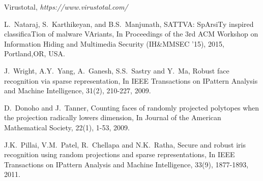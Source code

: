 \documentclass[journal]{IEEEtran}
\begin{document}
\begin{thebibliography}{1}
Virustotal, {\it https://www.virustotal.com/}

L.~Nataraj, S.~Karthikeyan, and B.S.~Manjunath, SATTVA: SpArsiTy inspired classificaTion of malware VAriants, In Proceedings of the 3rd ACM Workshop on Information Hiding and Multimedia Security (IH\&MMSEC '15), 2015, Portland,OR, USA.





J.~Wright, A.Y.~Yang, A.~Ganesh, S.S.~Sastry and Y.~Ma, Robust face recognition via sparse representation, In IEEE Transactions on IPattern Analysis and Machine Intelligence, 31(2), 210-227, 2009. 

D.~Donoho and J.~Tanner, Counting faces of randomly projected polytopes when the projection radically lowers dimension, In Journal of the American Mathematical Society, 22(1), 1-53, 2009. 



J.K.~Pillai, V.M.~Patel, R.~Chellapa and N.K.~Ratha, Secure and robust iris recognition using random projections and sparse representations, In IEEE Transactions on IPattern Analysis and Machine Intelligence, 33(9), 1877-1893, 2011. 


\end{thebibliography}
\end{document}
